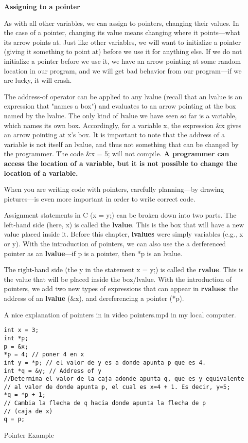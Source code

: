 \documentclass[11pt, a4paper]{article}
\begin{document}
\textbf{Assigning to a pointer}

As with all other variables, we can assign to pointers, changing their values. In the case of a pointer, changing its value means changing where it points—what its arrow points at. Just like other variables, we will want to initialize a pointer (giving it something to point at) before we use it for anything else. If we do not initialize a pointer before we use it, we have an arrow pointing at some random location in our program, and we will get bad behavior from our program—if we are lucky, it will crash.



The address-of operator can be applied to any lvalue (recall that an lvalue is an expression that "names a box") and evaluates to an arrow pointing at the box named by the lvalue. The only kind of lvalue we have seen so far is a variable, which names its own box. Accordingly, for a variable x, the expression \&x gives an arrow pointing at x’s box. It is important to note that the address of a variable is not itself an lvalue, and thus not something that can be changed by the programmer. The code \&x = 5; will not compile. \textbf{A programmer can access the location of a variable, but it is not possible to change the location of a variable.}


When you are writing code with pointers, carefully planning—by drawing pictures—is even more important in order to write correct code.

Assignment statements in C (x = y;) can be broken down into two parts. The left-hand side (here, x) is called the \textbf{lvalue}. This is the box that will have a new value placed inside it. Before this chapter, \textbf{lvalues} were simply variables (e.g., x or y). With the introduction of pointers, we can also use the a derferenced pointer as an \textbf{lvalue}—if p is a pointer, then *p is an lvalue.


The right-hand side (the y in the statement x = y;) is called the \textbf{rvalue}. This is the value that will be placed inside the box/lvalue. With the introduction of pointers, we add two new types of expressions that can appear in \textbf{rvalues}: the address of an \textbf{lvalue} (\&x), and dereferencing a pointer (*p).

A nice explanation of pointers in in video pointers.mp4 in my local computer. 



\begin{listing}
\begin{verbatim}
int x = 3;
int *p;
p = &x;
*p = 4; // poner 4 en x
int y = *p; // el valor de y es a donde apunta p que es 4.
int *q = &y; // Address of y
//Determina el valor de la caja adonde apunta q, que es y equivalente
// al valor de donde apunta p, el cual es x=4 + 1. Es decir, y=5;
*q = *p + 1;  
// Cambia la flecha de q hacia donde apunta la flecha de p 
// (caja de x)
q = p;
\end{verbatim}
\caption{Pointer Example}
\label{lst:pointer_example}
\end{listing}
\end{document}
